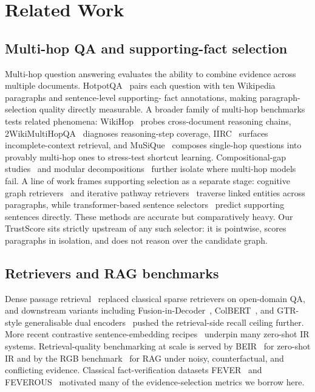 \section{Related Work}
\label{sec:related-work}

\subsection{Multi-hop QA and supporting-fact selection}

Multi-hop question answering evaluates the ability to combine evidence
across multiple documents. HotpotQA~\cite{yang2018hotpotqa} pairs each
question with ten Wikipedia paragraphs and sentence-level supporting-
fact annotations, making paragraph-selection quality directly
measurable. A broader family of multi-hop benchmarks tests related
phenomena: WikiHop~\cite{welbl2018wikihop} probes cross-document
reasoning chains, 2WikiMultiHopQA~\cite{ho2020constructing}
diagnoses reasoning-step coverage, IIRC~\cite{ferguson2020iirc}
surfaces incomplete-context retrieval, and
MuSiQue~\cite{trivedi2022musique} composes single-hop questions into
provably multi-hop ones to stress-test shortcut learning.
Compositional-gap studies~\cite{press2023measuring} and modular
decompositions~\cite{khot2023decomposed} further isolate where
multi-hop models fail. A line of work frames supporting selection as
a separate stage: cognitive graph retrievers~\cite{ding2019cognitivegraph}
and iterative pathway retrievers~\cite{asai2020learning} traverse
linked entities across paragraphs, while transformer-based sentence
selectors~\cite{nie2019revealing} predict supporting sentences
directly. These methods are accurate but comparatively heavy. Our
TrustScore sits strictly upstream of any such selector: it is
pointwise, scores paragraphs in isolation, and does not reason over
the candidate graph.

\subsection{Retrievers and RAG benchmarks}

Dense passage retrieval~\cite{karpukhin2020dense} replaced classical
sparse retrievers on open-domain QA, and downstream variants including
Fusion-in-Decoder~\cite{izacard2021fid},
ColBERT~\cite{khattab2020colbert,santhanam2022colbertv2}, and
GTR-style generalisable dual encoders~\cite{ni2022gtr} pushed the
retrieval-side recall ceiling further. More recent contrastive
sentence-embedding recipes~\cite{wang2022text} underpin many
zero-shot IR systems. Retrieval-quality benchmarking at scale is
served by BEIR~\cite{thakur2021beir} for zero-shot IR and by the
RGB benchmark~\cite{chen2024rgb} for RAG under noisy, counterfactual,
and conflicting evidence. Classical fact-verification datasets
FEVER~\cite{thorne2018fever} and
FEVEROUS~\cite{aly2021feverous} motivated many of the
evidence-selection metrics we borrow here.

